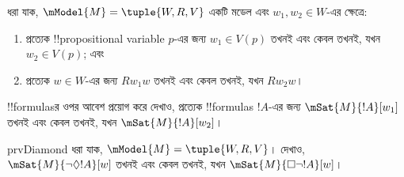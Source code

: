 \documentclass[../../../include/open-logic-section]{subfiles}
\begin{document}
\begin{prob}
  ধরা যাক, $\mModel{M} = \tuple{W, R, V}$ একটি মডেল এবং $w_1, w_2 \in
  W$-এর ক্ষেত্রে:
  \begin{enumerate}
  \item প্রত্যেক !!{propositional variable} $p$-এর জন্য $w_1 \in V(p)$ তখনই এবং কেবল তখনই, যখন $w_2 \in V(p)$; এবং
  \item প্রত্যেক $w \in W$-এর জন্য $Rw_1w$ তখনই এবং কেবল তখনই, যখন $Rw_2w$।
  \end{enumerate}
  !!{formula}sর ওপর আবেশ প্রয়োগ করে দেখাও, প্রত্যেক !!{formula}s $!A$-এর জন্য
  $\mSat{M}{!A}[w_1]$ তখনই এবং কেবল তখনই, যখন $\mSat{M}{!A}[w_2]$।
\end{prob}

\begin{probtag}{prvDiamond}
  ধরা যাক, $\mModel{M} = \tuple{W, R, V}$। দেখাও,
  $\mSat{M}{\lnot\Diamond !A}[w]$ তখনই এবং কেবল তখনই, যখন
  $\mSat{M}{\Box\lnot!A}[w]$।
\end{probtag}
\end{document}
